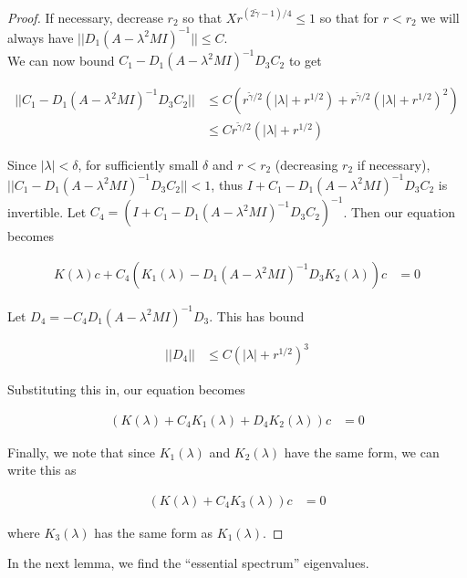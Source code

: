 \documentclass[thesis.tex]{subfiles}
\begin{document}
\begin{lemma}
\begin{proof}
If necessary, decrease $r_2$ so that $X r^{(2 \tilde{\gamma} - 1)/4} \leq 1$ so that for $r < r_2$ we will always have $|| D_1 (A - \lambda^2 MI)^{-1} || \leq C$.\\

We can now bound $C_1 - D_1 (A - \lambda^2 MI)^{-1} D_3 C_2$ to get

\begin{align*}
|| C_1 - D_1 (A - \lambda^2 MI)^{-1} D_3 C_2 || &\leq C \left( r^{\tilde{\gamma}/2} (|\lambda| + r^{1/2}) + r^{\tilde{\gamma}/2} (|\lambda| + r^{1/2})^2 \right) \\
&\leq C r^{\tilde{\gamma}/2} (|\lambda| + r^{1/2}) 
\end{align*}

Since $|\lambda| < \delta$, for sufficiently small $\delta$ and $r < r_2$ (decreasing $r_2$ if necessary), $|| C_1 - D_1 (A - \lambda^2 MI)^{-1} D_3 C_2 || < 1$, thus $I + C_1 - D_1 (A - \lambda^2 MI)^{-1} D_3 C_2$ is invertible. Let $C_4 = (I + C_1 - D_1 (A - \lambda^2 MI)^{-1} D_3 C_2)^{-1}$. Then our equation becomes

\begin{align*}
K(\lambda)c + C_4(K_1(\lambda) - D_1 (A - \lambda^2 MI)^{-1} D_3 K_2(\lambda))c &= 0
\end{align*}

Let $D_4 = -C_4 D_1 (A - \lambda^2 MI)^{-1} D_3$. This has bound

\begin{align*}
||D_4|| &\leq C (|\lambda| + r^{1/2})^3
\end{align*}

Substituting this in, our equation becomes

\begin{align*}
(K(\lambda) + C_4 K_1(\lambda) + D_4 K_2(\lambda))c &= 0
\end{align*}

Finally, we note that since $K_1(\lambda)$ and $K_2(\lambda)$ have the same form, we can write this as

\begin{align*}
(K(\lambda) + C_4 K_3(\lambda))c &= 0
\end{align*}

where $K_3(\lambda)$ has the same form as $K_1(\lambda)$.

\end{proof}
\end{lemma}

In the next lemma, we find the ``essential spectrum'' eigenvalues.
\end{document}
